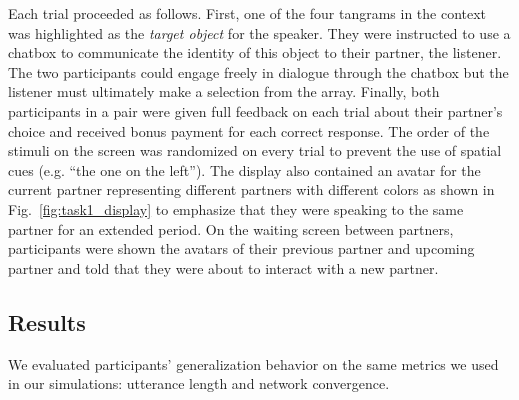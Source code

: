 Each trial proceeded as follows.
First, one of the four tangrams in the context was highlighted as the \emph{target object} for the speaker.
They were instructed to use a chatbox to communicate the identity of this object to their partner, the listener.
The two participants could engage freely in dialogue through the chatbox but the listener must ultimately make a selection from the array. 
Finally, both participants in a pair were given full feedback on each trial about their partner's choice and received bonus payment for each correct response. 
The order of the stimuli on the screen was randomized on every trial to prevent the use of spatial cues (e.g. ``the one on the left'').
The display also contained an avatar for the current partner  representing different partners with different colors as shown in Fig.~\ref{fig:task1_display} to emphasize that they were speaking to the same partner for an extended period.
On the waiting screen between partners, participants were shown the avatars of their previous partner and upcoming partner and told that they were about to interact with a new partner.

\subsection{Results}

We evaluated participants' generalization behavior on the same metrics we used in our simulations: utterance length and network convergence.

